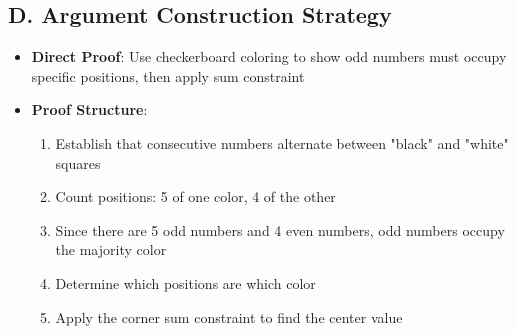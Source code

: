 \documentclass[11pt]{article}
\begin{document}
\begin{strategicbox}
\subsection*{D. Argument Construction Strategy}
\begin{itemize}[leftmargin=*]
    \item \textbf{Direct Proof}: Use checkerboard coloring to show odd numbers must occupy specific positions, then apply sum constraint
    \item \textbf{Proof Structure}:
    \begin{enumerate}
        \item Establish that consecutive numbers alternate between "black" and "white" squares
        \item Count positions: 5 of one color, 4 of the other
        \item Since there are 5 odd numbers and 4 even numbers, odd numbers occupy the majority color
        \item Determine which positions are which color
        \item Apply the corner sum constraint to find the center value
    \end{enumerate}
\end{itemize}
\end{strategicbox}
\end{document}
